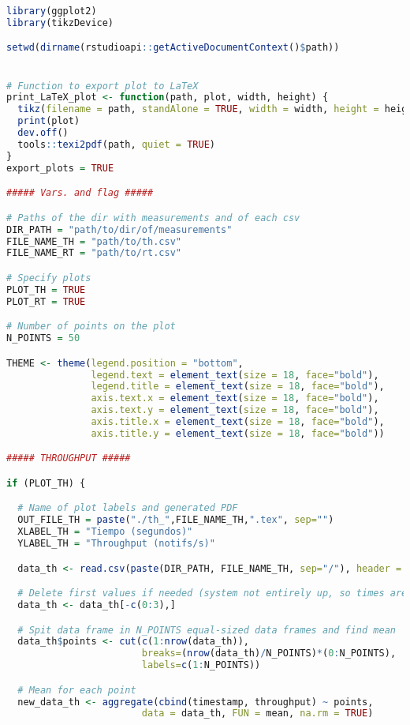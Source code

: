 \begin{lstlisting}[language=R, caption={Programa en R para generar las gráficas del Throughput y del Tiempo de Respuesta.}]
library(ggplot2)
library(tikzDevice)

setwd(dirname(rstudioapi::getActiveDocumentContext()$path))


# Function to export plot to LaTeX
print_LaTeX_plot <- function(path, plot, width, height) {
  tikz(filename = path, standAlone = TRUE, width = width, height = height)
  print(plot)
  dev.off()
  tools::texi2pdf(path, quiet = TRUE)
}
export_plots = TRUE

##### Vars. and flag #####

# Paths of the dir with measurements and of each csv
DIR_PATH = "path/to/dir/of/measurements"
FILE_NAME_TH = "path/to/th.csv"
FILE_NAME_RT = "path/to/rt.csv"

# Specify plots
PLOT_TH = TRUE
PLOT_RT = TRUE

# Number of points on the plot
N_POINTS = 50

THEME <- theme(legend.position = "bottom",
               legend.text = element_text(size = 18, face="bold"),
               legend.title = element_text(size = 18, face="bold"),
               axis.text.x = element_text(size = 18, face="bold"),
               axis.text.y = element_text(size = 18, face="bold"),
               axis.title.x = element_text(size = 18, face="bold"),
               axis.title.y = element_text(size = 18, face="bold"))

##### THROUGHPUT #####

if (PLOT_TH) {

  # Name of plot labels and generated PDF
  OUT_FILE_TH = paste("./th_",FILE_NAME_TH,".tex", sep="")
  XLABEL_TH = "Tiempo (segundos)"
  YLABEL_TH = "Throughput (notifs/s)"

  data_th <- read.csv(paste(DIR_PATH, FILE_NAME_TH, sep="/"), header = TRUE, sep = ",")

  # Delete first values if needed (system not entirely up, so times are very high)
  data_th <- data_th[-c(0:3),]

  # Spit data frame in N_POINTS equal-sized data frames and find mean
  data_th$points <- cut(c(1:nrow(data_th)),
                        breaks=(nrow(data_th)/N_POINTS)*(0:N_POINTS),
                        labels=c(1:N_POINTS))

  # Mean for each point
  new_data_th <- aggregate(cbind(timestamp, throughput) ~ points,
                        data = data_th, FUN = mean, na.rm = TRUE)


\end{lstlisting}
